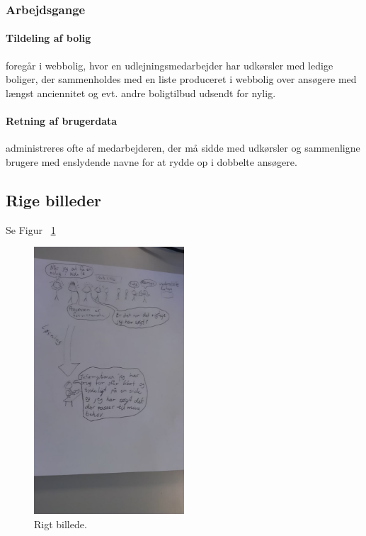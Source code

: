 \documentclass[12pt, a4paper]{report}
\begin{document}
\subsubsection{Arbejdsgange}
\paragraph{Tildeling af bolig} foregår i webbolig, hvor en udlejningsmedarbejder har udkørsler med ledige boliger, der sammenholdes med en liste produceret i webbolig over ansøgere med længst anciennitet og evt. andre boligtilbud udsendt for nylig.

\paragraph{Retning af brugerdata} administreres ofte af medarbejderen, der må sidde med udkørsler og sammenligne brugere med enslydende navne for at rydde op i dobbelte ansøgere.

\subsection{Rige billeder}
Se Figur ~\ref{r_billede}
\begin{figure}[p!]
\includegraphics[width=0.5\textwidth]{rigtbillede}
\caption{Rigt billede.}
\label{r_billede}
\end{figure}
\end{document}
